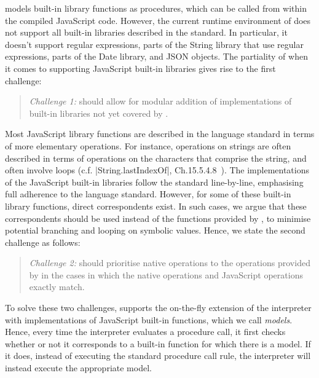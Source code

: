 \JSComp models built-in library functions as \jsil procedures, which can be called from within the compiled JavaScript code. However, the current runtime environment of \JSComp does not support all built-in libraries described in the standard. In particular, it doesn't support regular expressions, parts of the String library that use regular expressions, parts of the Date library, and JSON objects. The partiality of \JSComp when it comes to supporting JavaScript built-in libraries 
gives rise to the first challenge:  
\begin{quote}
\emph{Challenge 1:} \jilette should allow for modular addition of  
implementations of built-in libraries not yet covered by \JSComp.  
\end{quote}

Most JavaScript library functions are described in the language standard in terms of 
more elementary operations. For instance, operations on strings are often described in terms 
of operations on the characters that comprise the string, and often involve loops (c.f. \jsinline|String.lastIndexOf|, Ch.15.5.4.8~\cite{ecma}).
The \jsil implementations of the JavaScript built-in libraries follow the standard line-by-line, emphasising full adherence to the language standard. 
However, for some of these built-in library functions, direct \rosette correspondents exist. 
%
In such cases, we argue that these correspondents should be used instead of the 
functions provided by \JSComp, to minimise potential branching and looping on symbolic values. 
Hence, we state the second challenge as follows: 
\begin{quote}
\emph{Challenge 2:} \jilette should prioritise native \rosette operations
to the operations provided by \JSComp in the cases in which the native \rosette
operations and JavaScript operations exactly match.
\end{quote}

To solve these two challenges, \jilette supports the on-the-fly extension of the \jsil interpreter 
with \rosette implementations of JavaScript built-in functions, which we call \rosette \emph{models}. 
Hence, every time the interpreter evaluates a procedure call, it first checks whether or 
not it corresponds to a built-in function for which there is a \rosette model. If it does, 
instead of executing the standard procedure call rule, the interpreter will instead 
execute the appropriate \rosette model. 

